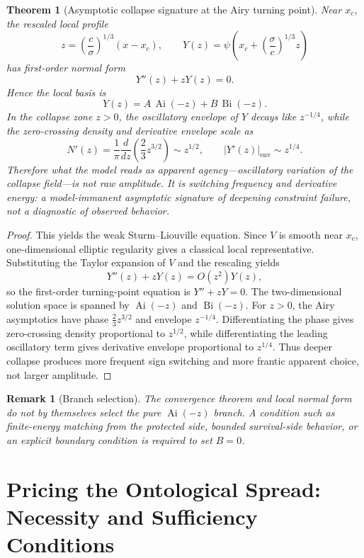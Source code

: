 \documentclass[review,authoryear]{elsarticle}
\newtheorem{theorem}{Theorem}
\newtheorem{remark}{Remark}
\theoremstyle{definition}
\theoremstyle{plain}
\begin{document}
\begin{theorem}[Asymptotic collapse signature at the Airy turning point]
\label{thm:airy-inverse-agency}
Near $x_c$, the rescaled local profile
\[
z=\left(\frac{c}{\sigma}\right)^{1/3}(x-x_c),
\qquad
Y(z)=\psi\!\left(x_c+\left(\frac{\sigma}{c}\right)^{1/3}z\right)
\]
has first-order normal form
\[
Y''(z)+zY(z)=0.
\]
Hence the local basis is
\[
Y(z)=A\,\operatorname{Ai}(-z)+B\,\operatorname{Bi}(-z).
\]
In the collapse zone $z>0$, the oscillatory envelope of $Y$ decays like $z^{-1/4}$, while the zero-crossing density and derivative envelope scale as
\[
N'(z)
=
\frac{1}{\pi}\frac{d}{dz}\left(\frac{2}{3}z^{3/2}\right)
\sim z^{1/2},
\qquad
|Y'(z)|_{\mathrm{env}}\sim z^{1/4}.
\]
Therefore what the model reads as apparent agency---oscillatory variation of the collapse field---is not raw amplitude.  It is switching frequency and derivative energy: a model-immanent asymptotic signature of deepening constraint failure, not a diagnostic of observed behavior.
\end{theorem}
\begin{proof}
This yields the weak Sturm--Liouville equation.  Since $V$ is smooth near $x_c$, one-dimensional elliptic regularity gives a classical local representative.  Substituting the Taylor expansion of $V$ and the rescaling yields
\[
Y''(z)+zY(z)=O(z^2)Y(z),
\]
so the first-order turning-point equation is $Y''+zY=0$.  The two-dimensional solution space is spanned by $\operatorname{Ai}(-z)$ and $\operatorname{Bi}(-z)$.  For $z>0$, the Airy asymptotics have phase $\frac23z^{3/2}$ and envelope $z^{-1/4}$.  Differentiating the phase gives zero-crossing density proportional to $z^{1/2}$, while differentiating the leading oscillatory term gives derivative envelope proportional to $z^{1/4}$.  Thus deeper collapse produces more frequent sign switching and more frantic apparent choice, not larger amplitude.
\end{proof}

\begin{remark}[Branch selection]
\label{rem:airy-branch-selection}
The convergence theorem and local normal form do not by themselves select the pure $\operatorname{Ai}(-z)$ branch.  A condition such as finite-energy matching from the protected side, bounded survival-side behavior, or an explicit boundary condition is required to set $B=0$.
\end{remark}
\section{Pricing the Ontological Spread: Necessity and Sufficiency Conditions}
\label{sec:mechanism}
\end{document}

